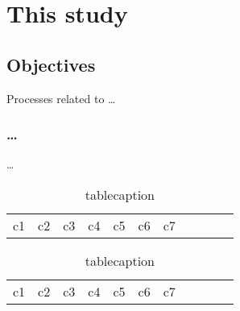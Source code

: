 \chapter{This study}
\label{chap:thisstudy}
\section{Objectives}
Processes related to \ldots
\subsection{\ldots}
\ldots 

\begin{table}[!htbp]\centering
\def\arraystretch{1.3}
\caption{tablecaption}
\vspace{5pt}
    \small
\setlength{\tabcolsep}{4pt}
\begin{tabular}{lcrccccccll}
\hline
 c1 & c2 & c3 & c4 & c5 & c6 & c7 \\
\end{tabular}
\label{Tab:1}
\end{table}
\normalsize

\newpage
\begin{landscape}
\begin{table}[!htbp]\centering
\def\arraystretch{1.3}
\caption{tablecaption}
\vspace{5pt}
    \small
\setlength{\tabcolsep}{4pt}
\begin{tabular}{lcrccccccll}
\hline
 c1 & c2 & c3 & c4 & c5 & c6 & c7 \\
\end{tabular}
\label{Tab:2}
\end{table}
\end{landscape}
\normalsize

